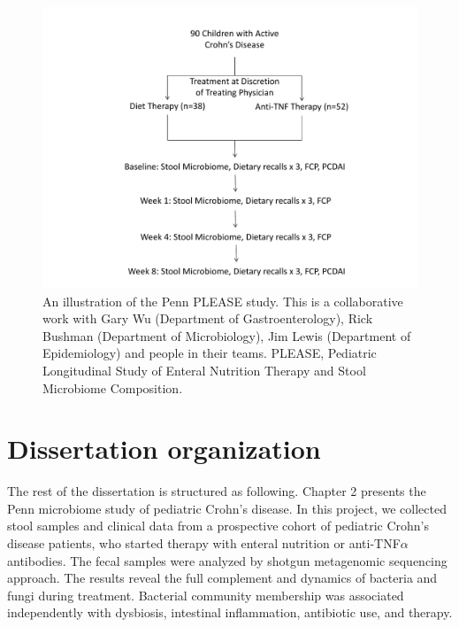 \begin{figure}[p]
\begin{center}
\includegraphics[scale=0.60,trim=40 0 0 0,clip]{Figure/F12_PLEASE_Study.pdf}
\caption[An illustration of the PLEASE study at University of Pennsylvania.]{An illustration of the Penn PLEASE study. This is a collaborative work with Gary Wu (Department of Gastroenterology), Rick Bushman (Department of Microbiology), Jim Lewis (Department of Epidemiology) and people in their teams. PLEASE, Pediatric Longitudinal Study of Enteral Nutrition Therapy and Stool Microbiome Composition.} \label{F12_PLEASE_Study}
\end{center}
\end{figure}



\section{Dissertation organization }

The rest of the dissertation is structured as following. Chapter 2 presents the Penn microbiome study of pediatric Crohn's disease. In this project, we collected stool samples and clinical data from a prospective cohort of pediatric Crohn's disease patients, who started therapy with enteral nutrition or anti-TNF$\alpha$ antibodies. The fecal samples were analyzed by shotgun metagenomic sequencing approach. The results reveal the full complement and dynamics of bacteria and fungi during treatment. Bacterial community membership was associated independently with dysbiosis, intestinal inflammation, antibiotic use, and therapy.

